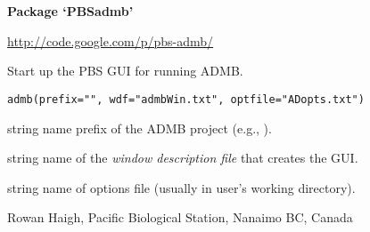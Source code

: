 \documentclass[letterpaper]{book}
\begin{document}
\setcounter{page}{17}
\chapter*{}
\begin{center}
{\textbf{\huge Package `PBSadmb'}}
\par\bigskip{\large \today}
\end{center}
\begin{description}
\raggedright{}
\item[Version]
\item[Date]
\item[Title]
\item[Author]
\item[Maintainer]\AsIs{}
\item[Depends]
\item[Description]
\item[License]
\item[URL]\AsIs{}\url{http://code.google.com/p/pbs-admb/}\AsIs{}
\end{description}
%
\begin{Description}\relax
Start up the PBS GUI for running ADMB.
\end{Description}
%
\begin{Usage}
\begin{verbatim}
admb(prefix="", wdf="admbWin.txt", optfile="ADopts.txt")
\end{verbatim}
\end{Usage}
%
\begin{Arguments}
\begin{ldescription}
\item[\code{prefix}] string name prefix of the ADMB project (e.g., ).
\item[\code{wdf}] string name of the \emph{window description file} that creates the GUI.
\item[\code{optfile}] string name of options file (usually in user's working directory).
\end{ldescription}
\end{Arguments}
%
\begin{Author}\relax
 Rowan Haigh, Pacific Biological Station, Nanaimo BC, Canada 
\end{Author}
\end{document}
